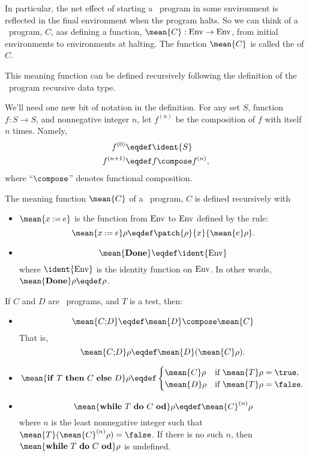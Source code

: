 In particular, the net effect of starting a \while\ program in some
environment is reflected in the final environment when the program
halts.  So we can think of a \while\ program, $C$, aas defining a
function, $\mean{C}:\Env \to \Env$, from initial environments to
environments at halting.  The function $\mean{C}$ is called
the  of $C$.
\iffalse
$\mean{C}$ of a \while\ program, $C$ to be a partial function from $\Env$ to $\Env$
mapping an initial environment to the final halting environment.
\fi
This meaning function can be defined recursively following the
definition of the \while\ program recursive data type.

We'll need one new bit of notation in the definition.  For any set
$S$, function $f:S \to S$, and nonnegative integer $n$, let $f^{(n)}$
be the composition of $f$ with itself $n$ times.  Namely,
\begin{align*}
f^{(0)} & \eqdef \ident{S}\\
f^{(n+1)} & \eqdef f \compose f^{(n)},
\end{align*}
where ``$\compose$'' denotes functional composition.

\begin{definition}
The meaning function $\mean{C}$ of a \while\ program, $C$ is defined recursively with

\begin{itemize}

\item $\mean{x \assigned e}$ is the function from $\Env$ to $\Env$ defined
  by the rule:
\[
\mean{x \assigned e}\rho \eqdef \patch{\rho}{x}{\mean{e}\rho}.
\]

\item
\[
\mean{\halt} \eqdef \ident{\Env}
\]
where $\ident{\Env}$ is the identity function on $\Env$.  In other words,
$\mean{\halt}\rho \eqdef \rho$.

\end{itemize}

If $C$ and $D$ are \while\ programs, and $T$ is a test, then:
\begin{itemize}

\item
\[
\mean{\seqcomm{C}{D}} \eqdef \mean{D} \compose \mean{C}
\]
That is,
\[
\mean{\seqcomm{C}{D}}\rho \eqdef \mean{D}(\mean{C}\rho).
\]

\item
\[
\mean{\condcomm{T}{C}{D}}\rho
\eqdef
\begin{cases}
\mean{C}\rho & \text{if } \mean{T}\rho = \true,\\
\mean{D}\rho & \text{if } \mean{T}\rho = \false.
\end{cases}
\]

\item
\[
\mean{\wloop{T}{C}}\rho \eqdef \mean{C}^{(n)}\rho
\]
where $n$ is the least nonnegative integer such that
$\mean{T}(\mean{C}^{(n)}\rho) = \false$.  If there is no such $n$, then
$\mean{\wloop{T}{C}}\rho$ is undefined.
\end{itemize}

\end{definition}

